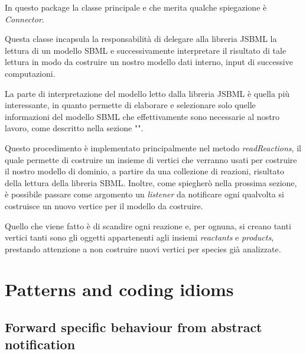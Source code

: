 In questo package la classe principale e che merita qualche
spiegazione \`e \emph{Connector}.

Questa classe incapsula la responsabilit\`a di delegare alla libreria
JSBML la lettura di un modello SBML e successivamente interpretare il
risultato di tale lettura in modo da costruire un nostro modello dati
interno, input di successive computazioni.

La parte di interpretazione del modello letto dalla libreria JSBML \`e
quella pi\`u interessante, in quanto permette di elaborare e
selezionare solo quelle informazioni del modello SBML che
effettivamente sono necessarie al nostro lavoro, come descritto nella
sezione "". 

Questo procedimento \`e implementato principalmente nel metodo
\emph{readReactions}, il quale permette di costruire un insieme di
vertici che verranno usati per costruire il nostro modello di dominio,
a partire da una collezione di reazioni, risultato della lettura della
libreria SBML. Inoltre, come spiegher\`o nella prossima sezione, \`e
possibile passare come argomento un \emph{listener} da notificare ogni
qualvolta si costruisce un nuovo vertice per il modello da costruire.

Quello che viene fatto \`e di scandire ogni reazione e, per ognuna, si
creano tanti vertici tanti sono gli oggetti appartenenti agli insiemi
\emph{reactants} e \emph{products}, prestando attenzione a non
costruire nuovi vertici per species gi\`a analizzate.

\section*{Patterns and coding idioms}

\subsection{Forward specific behaviour from abstract notification}

